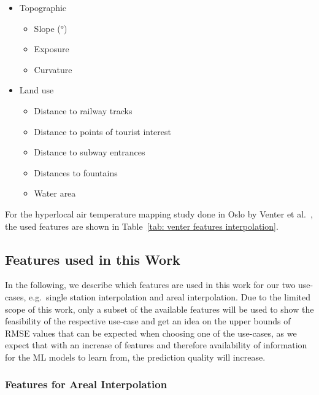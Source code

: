 \begin{itemize}
    \item Topographic

    \begin{itemize}
        \item Slope (°)
        \item Exposure
        \item Curvature
    \end{itemize}
    \item Land use

    \begin{itemize}
        \item Distance to railway tracks
        \item Distance to points of tourist interest
        \item Distance to subway entrances
        \item Distances to fountains
        \item Water area
    \end{itemize}
\end{itemize}

For the hyperlocal air temperature mapping study done in Oslo by Venter et al.~\cite{venter2020hyperlocal}, the used features are shown in Table~\ref{tab: venter features interpolation}.

\subsection{Features used in this Work}

In the following, we describe which features are used in this work for our two use-cases, e.g.\ single station interpolation and areal interpolation. Due to the limited scope of this work, only a subset of the available features will be used to show the feasibility of the respective use-case and get an idea on the upper bounds of RMSE values that can be expected when choosing one of the use-cases, as we expect that with an increase of features and therefore availability of information for the ML models to learn from, the prediction quality will increase.

\subsubsection{Features for Areal Interpolation}

